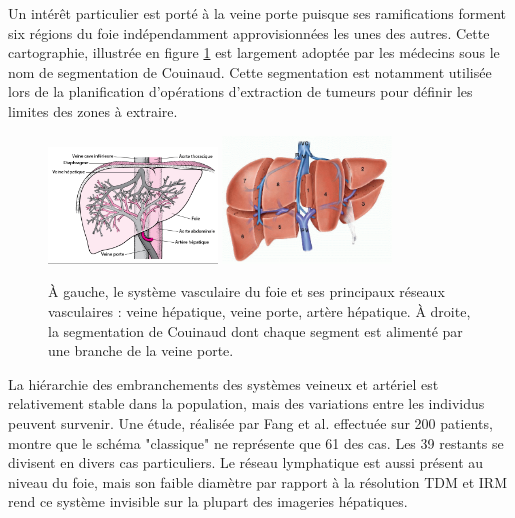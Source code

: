 Un intérêt particulier est porté à la veine porte puisque ses ramifications forment six régions du foie indépendamment approvisionnées les unes des autres. Cette cartographie, illustrée en figure \ref{fig:liver veins} est largement adoptée par les médecins sous le nom de segmentation de Couinaud. Cette segmentation est notamment utilisée lors de la planification d'opérations d'extraction de tumeurs pour définir les limites des zones à extraire. 
\begin{figure}[!ht]
    \centering
    \includegraphics[width=0.4\textwidth]{Images/Liver_vasculature.png}
    \includegraphics[width=0.4\textwidth]{Images/Couinaud.png}
    \caption{À gauche, le système vasculaire du foie et ses principaux réseaux vasculaires : veine hépatique, veine porte, artère hépatique. À droite, la segmentation de Couinaud dont chaque segment est alimenté par une branche de la veine porte.\protect \footnotemark} 
    \label{fig:liver veins}
  \end{figure}

La hiérarchie des embranchements des systèmes veineux et artériel est relativement stable dans la population, mais des variations entre les individus peuvent survenir. Une étude, réalisée par Fang et al. \cite{Fang2012_Liver_vein_variations} effectuée sur 200 patients, montre que le schéma "classique" ne représente que 61 \percent{}des cas. Les 39 \percent{}restants se divisent en divers cas particuliers. Le réseau lymphatique est aussi présent au niveau du foie, mais son faible diamètre par rapport à la résolution TDM et IRM rend ce système invisible sur la plupart des imageries hépatiques. 

